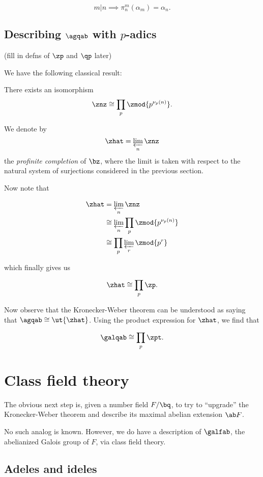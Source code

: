 \[ m|n \implies \pi_n^m(\alpha_m) = \alpha_n. \]

\subsection{Describing $\agqab$ with $p$-adics}
(fill in defns of $\zp$ and $\qp$ later)

We have the following classical result:

\begin{thm}
  There exists an isomorphism
  \[ \znz \cong \prod_p \zmod {p^{\nu_p(n)}}. \]
\end{thm}

\begin{defn}
  We denote by
  \[ \zhat = \varprojlim_n \znz \]
  the \textit{profinite completion} of $\bz$, where the limit is taken with
  respect to the natural system of surjections considered in the previous section.
\end{defn}

Now note that

\begin{align*}
  \zhat &= \varprojlim_n \znz \\
        &\cong \varprojlim_n \prod_p \zmod {p^{\nu_p(n)}} \\
        &\cong \prod_p \varprojlim_r \zmod {p^r} 
\end{align*}

which finally gives us

\[ \zhat \cong \prod_p \zp. \]

Now observe that the Kronecker-Weber theorem can be understood as saying that
$\agqab \cong \ut{\zhat}$. Using the product expression for $\zhat$, we find
that

\[ \galqab \cong \prod_p \zpt. \]

\section{Class field theory}
The obvious next step is, given a number field $F/\bq$, to try to ``upgrade''
the Kronecker-Weber theorem and describe its maximal abelian extension $\ab F$.

No such analog is known. However, we do have a description of $\galfab$, the
abelianized Galois group of $F$, via class field theory.

\subsection{Adeles and ideles}
\label{sec:adeles-ideles}

